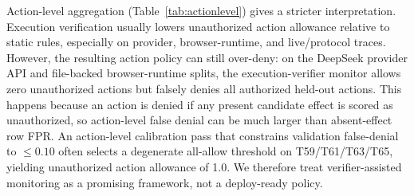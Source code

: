 \documentclass{article}
\begin{document}
Action-level aggregation (Table~\ref{tab:actionlevel}) gives a stricter interpretation. Execution verification usually lowers unauthorized action allowance relative to static rules, especially on provider, browser-runtime, and live/protocol traces. However, the resulting action policy can still over-deny: on the DeepSeek provider API and file-backed browser-runtime splits, the execution-verifier monitor allows zero unauthorized actions but falsely denies all authorized held-out actions. This happens because an action is denied if any present candidate effect is scored as unauthorized, so action-level false denial can be much larger than absent-effect row FPR. An action-level calibration pass that constrains validation false-denial to $\leq 0.10$ often selects a degenerate all-allow threshold on T59/T61/T63/T65, yielding unauthorized action allowance of 1.0. We therefore treat verifier-assisted monitoring as a promising framework, not a deploy-ready policy.

\begin{table}[t]
\centering
\caption{Trace-view and proxy-defense ablations, averaged across T58/T59/T61/T63/T65/T64 held-out trace-group tests. Full-label EffectVerif is the existing upper-bound execution verifier. Label-hidden EffectVerif hides explicit trace label fields. The last three rows are proxy baselines, not faithful reimplementations of any external defense system.}
\label{tab:traceablation}
\end{table}
\end{document}
